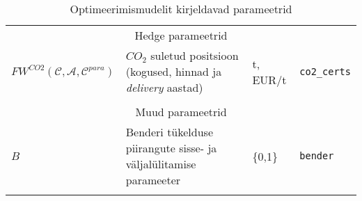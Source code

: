 \begin{landscape}
\begin{longtable}{l l l l}
\\ \multicolumn{4}{c}{Hedge parameetrid} \\
$\mathit{FW}^{CO2}(\mathcal{C}, \mathcal{A}, \mathcal{C}^{para})$ & $CO_2$ suletud positsioon (kogused, hinnad ja \emph{delivery} aastad)& t, EUR/t & \texttt{co2\_certs} \\

\\ \multicolumn{4}{c}{Muud parameetrid} \\
$\mathit{B}$ & Benderi tükelduse piirangute sisse- ja väljalülitamise parameeter & \{0,1\} & \texttt{bender} \\
  
\caption{Optimeerimismudelit kirjeldavad parameetrid \label{tab:para}} 
\end{longtable}
\normalsize
\end{landscape}
